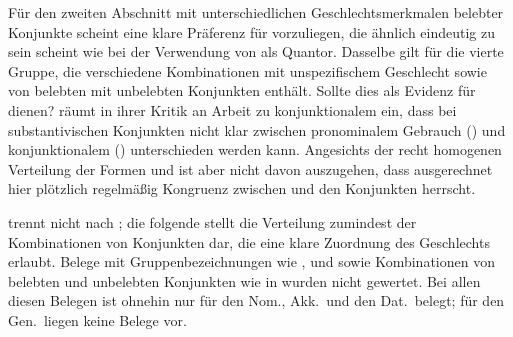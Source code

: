 Für den zweiten Abschnitt mit unterschiedlichen
Geschlechtsmerkmalen belebter Konjunkte scheint
eine klare Präferenz für  vorzuliegen, die ähnlich eindeutig zu
sein scheint wie bei der Verwendung von  als Quantor. Dasselbe gilt
für die vierte Gruppe, die verschiedene Kombinationen mit unspezifischem
Geschlecht sowie von belebten mit unbelebten Konjunkten enthält.
Sollte dies als Evidenz für  dienen?
\citet[187]{gjelsten1980} räumt in ihrer Kritik an 
Arbeit zu konjunktionalem  ein, dass bei
substantivischen Konjunkten nicht klar zwischen pronominalem
Gebrauch () und konjunktionalem ()
unterschieden werden kann. Angesichts der recht homogenen Verteilung der Formen
 und  ist aber nicht davon auszugehen, dass
ausgerechnet hier plötzlich regelmäßig Kongruenz zwischen  und den
Konjunkten herrscht.

 trennt nicht nach ; die folgende
 stellt die Verteilung zumindest der
Kombinationen von Konjunkten dar, die eine klare Zuordnung des Geschlechts
erlaubt. Belege mit Gruppenbezeichnungen wie  ,   und   sowie Kombinationen von
belebten und unbelebten Konjunkten wie in 
 wurden nicht gewertet. Bei allen diesen
Belegen ist ohnehin nur  für den Nom., Akk.\ und den Dat.\ belegt;
für den Gen.\ liegen keine Belege vor.

